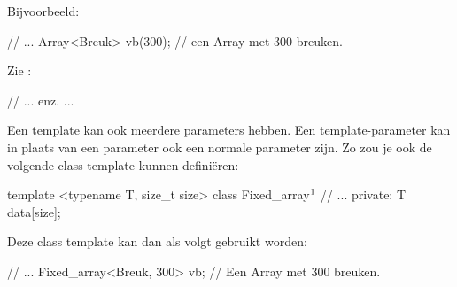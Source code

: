 \begin{cpplstShortInline}
Bijvoorbeeld:
\begin{cpplstfragment}
//  ...
    Array<Breuk> vb(300); // een Array met 300 breuken.
\end{cpplstfragment}

\label{sec:class template array}
Zie :
\vspace{-.8\baselineskip}
\begin{cpplstfragment}
// ... enz. ...
\end{cpplstfragment}
\vspace{-.8\baselineskip}

Een template kan ook meerdere parameters hebben.
Een template\hyp{}parameter kan in plaats van een  parameter ook een normale parameter zijn.
Zo zou je ook de volgende class template kunnen definiëren:
\begin{cpplstfragment}[mathescape=true]
template <typename T, size_t size> class Fixed_array$\footnotemark$ {
    // ...
private:
    T data[size];
}
\end{cpplstfragment}


Deze class template kan dan als volgt gebruikt worden:
\begin{cpplstfragment}
//  ...
    Fixed_array<Breuk, 300> vb; // Een Array met 300 breuken.
\end{cpplstfragment}


\end{cpplstShortInline}
